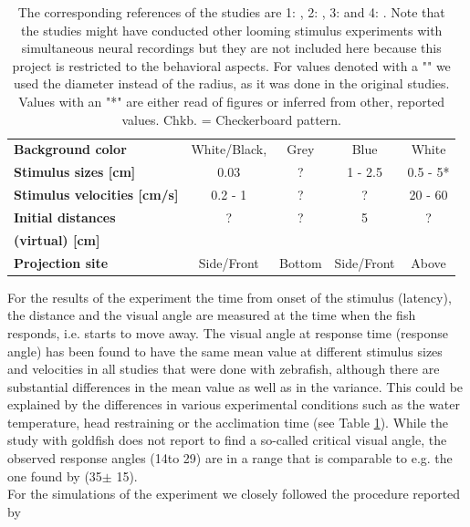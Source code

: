 \documentclass[a4paper,10pt,hidelinks]{scrreprt}
\begin{document}
\begin{table} [!th]
\begin{center}
\begin{tabular}{l|c|c|c|c}
				\textbf{Background color} & White/Black, & Grey & Blue & White\\
				\textbf{Stimulus sizes [cm]} & 0.03 & ? & 1 - 2.5 & 0.5 - 5*\\
				\textbf{Stimulus velocities [cm/s]} & 0.2 - 1 & ? & ? & 20 - 60\\
				\textbf{Initial distances} & ? & ? & 5 & ?\\
				\textbf{(virtual) [cm]} &  &  &  & \\
				\textbf{Projection site} & Side/Front & Bottom & Side/Front & Above\\
			\end{tabular}
		\end{center}
		\caption{The corresponding references of the studies are 1: \cite{Temizer2015}, 
		2: \cite{Dunn2016}, 3: \cite{Bhattacharyya2017} and 4: \cite{Preuss2006}.
		Note that the studies might have conducted other looming stimulus experiments with 
		simultaneous neural recordings but they are not included here because this project is 
		restricted to the behavioral aspects.
		For values denoted with a "\dag" we used the diameter 
		instead of the radius, as it was done in the original studies.
		Values with an "*" are either 
		read of figures or inferred from other, reported values. Chkb. = Checkerboard pattern.}
		\label{tab:looming_exp}
	\end{table}
	For the results of the experiment the time from onset of the stimulus (latency), the distance and the 
	visual angle are measured at the time when the fish responds, i.e. starts to move away.
	The visual angle at response time (response angle) has been found to have the same mean value 
	at different stimulus sizes and velocities in all studies that were done with zebrafish, 
	although there are substantial differences in the mean value as well as in the variance.
	This could be explained by the differences in various experimental conditions such as the water 
	temperature, head restraining or the acclimation time (see Table \ref{tab:looming_exp}).
	While the study with goldfish \citep{Preuss2006} does not report to find a so-called critical visual angle, the observed response angles (14\textdegree to 29\textdegree) are in a range 
	that is comparable to e.g. the one found by \cite{Bhattacharyya2017} (35\textdegree $\pm$ 
	15\textdegree).\\
	For the simulations of the experiment we closely followed the procedure reported by 
\end{document}

